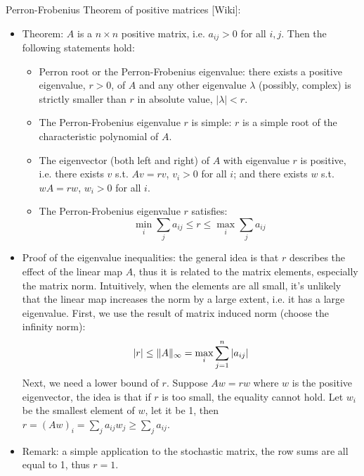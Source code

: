 \documentclass{report}
\begin{document}
Perron-Frobenius Theorem of positive matrices [Wiki]:
\begin{itemize}
\item Theorem: $A$ is a $n \times n$ positive matrix, i.e. $a_{ij} > 0$ for all $i,j$. Then the following statements hold: 
\begin{itemize}
\item Perron root or the Perron-Frobenius eigenvalue: there exists a positive eigenvalue, $r > 0$, of $A$ and any other eigenvalue $\lambda$ (possibly, complex) is strictly smaller than $r$ in absolute value, $|\lambda| < r$.
\item The Perron-Frobenius eigenvalue $r$ is simple: $r$ is a simple root of the characteristic polynomial of $A$. 
\item The eigenvector (both left and right) of $A$ with eigenvalue $r$ is positive, i.e. there exists $v$ s.t. $A v = r v$, $v_i > 0$ for all $i$; and there exists $w$ s.t. $w A = r w$, $w_i > 0$ for all $i$. 
\item The Perron-Frobenius eigenvalue $r$ satisfies: 
\begin{equation}
\min_i \sum_j a_{ij} \leq r \leq 	\max_i \sum_j a_{ij}
\end{equation}
\end{itemize}

\item Proof of the eigenvalue inequalities: the general idea is that $r$ describes the effect of the linear map $A$, thus it is related to the matrix elements, especially the matrix norm. Intuitively, when the elements are all small, it's unlikely that the linear map increases the norm by a large extent, i.e. it has a large eigenvalue. First, we use the result of matrix induced norm (choose the infinity norm):
\begin{equation}
|r| \leq \lVert A\rVert_{\infty} = \max_{i} \sum_{j=1}^n |a_{ij}|
\end{equation}
Next, we need a lower bound of $r$. Suppose $A w = r w$ where $w$ is the positive eigenvector, the idea is that if $r$ is too small, the equality cannot hold. Let $w_i$ be the smallest element of $w$, let it be 1, then $r = (Aw)_i = \sum_j a_{ij} w_j \geq \sum_j a_{ij}$. 

\item Remark: a simple application to the stochastic matrix, the row sums are all equal to 1, thus $r = 1$. 
\end{itemize}
\end{document}
